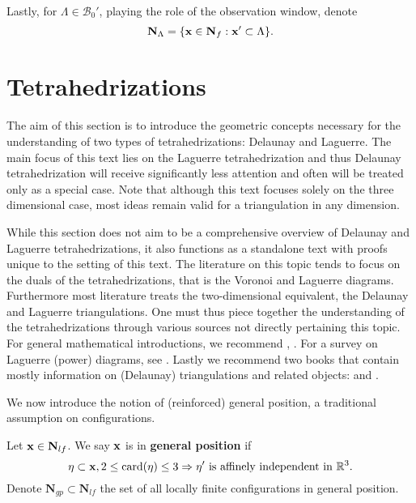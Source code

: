 Lastly, for $\Lambda \in \mathcal B_0'$, playing the role of the observation window, denote 
$$\mathbf N_\Lambda = \{ {\mathbf{x}} \in \mathbf N_{f}: {\mathbf{x}}'\subset \Lambda\}.$$

\section{Tetrahedrizations}\label{sec:tetrahedrizations}
The aim of this section is to introduce the geometric concepts necessary for the understanding of two types of tetrahedrizations: Delaunay and Laguerre. The main focus of this text lies on the Laguerre tetrahedrization and thus Delaunay tetrahedrization will receive significantly less attention and often will be treated only as a special case. Note that although this text focuses solely on the three dimensional case, most ideas remain valid for a triangulation in any dimension.

While this section does not aim to be a comprehensive overview of Delaunay and Laguerre tetrahedrizations, it also functions as a standalone text with proofs unique to the setting of this text. The literature on this topic tends to focus on the duals of the tetrahedrizations, that is the Voronoi and Laguerre diagrams. Furthermore most literature treats the two-dimensional equivalent, the Delaunay and Laguerre triangulations. One must thus piece together the understanding of the tetrahedrizations through various sources not directly pertaining this topic. For general mathematical introductions, we recommend \cite{Okabe1992}, \cite{Gavrilova}. For a survey on Laguerre (power) diagrams, see \cite{Aurenhammer1987}. Lastly we recommend two books that contain mostly information on (Delaunay) triangulations and related objects: \cite{Delorea2010} and \cite{Aurenhammer2013}. \newline

\noindent We now introduce the notion of (reinforced) general position, a traditional assumption on configurations.

\begin{definition}
Let ${\mathbf{x}} \in \mathbf N_{lf}$. We say ${\mathbf{x}}$ is in \textbf{general position} if 
$$ \eta \subset {\mathbf{x}}, 2 \leq \mathrm{card}(\eta) \leq 3 \Rightarrow \eta' \text{ is affinely independent in } {\mathbb R^3}. $$   
Denote $\mathbf N_{gp}\subset \mathbf N_{lf}$ the set of all locally finite configurations in general position.
\end{definition}
 
